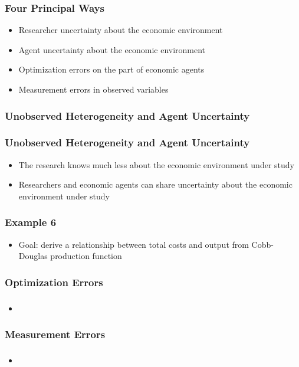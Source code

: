 \documentclass{beamer}
\begin{document}
\begin{frame}
\frametitle{Four Principal Ways}
\begin{itemize}
\item Researcher uncertainty about the economic environment
\item Agent uncertainty about the economic environment
\item Optimization errors on the part of economic agents
\item Measurement errors in observed variables
\end{itemize}
\end{frame}

\subsubsection{Unobserved Heterogeneity and Agent Uncertainty}
\begin{frame}
\frametitle{Unobserved Heterogeneity and Agent Uncertainty}
\begin{itemize}
\item The research knows much less about the economic environment under study
\item Researchers and economic agents can share uncertainty about the economic environment under study
\end{itemize}
\end{frame}

\begin{frame}
\frametitle{Example 6}
\begin{itemize}
\item Goal: derive a relationship between total costs and output from Cobb-Douglas production function
\end{itemize}
\end{frame}


\subsubsection{Optimization Errors}
\begin{frame}
\frametitle{}
\begin{itemize}
\item 
\end{itemize}
\end{frame}

\subsubsection{Measurement Errors}
\begin{frame}
\frametitle{}
\begin{itemize}
\item 
\end{itemize}
\end{frame}
\end{document}
